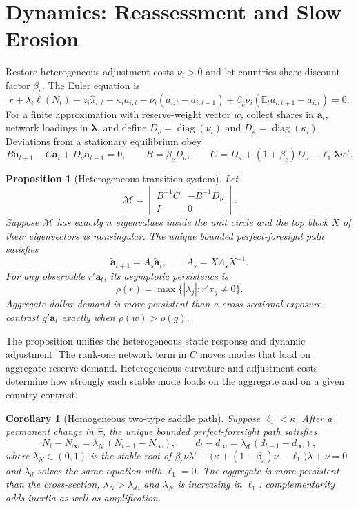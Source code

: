 \documentclass[11pt]{article}
\newtheorem{proposition}{Proposition}
\newtheorem{corollary}{Corollary}
\theoremstyle{definition}
\newcommand{\E}{\mathbb{E}}
\begin{document}
\section{Dynamics: Reassessment and Slow Erosion}\label{sec:dynamics}

Restore heterogeneous adjustment costs $\nu_i>0$ and let countries share discount factor $\beta_c$. The Euler equation is
\begin{equation}
\bar r+\lambda_i\ell(N_t)-z_i\hat\pi_{i,t}-\kappa_i a_{i,t}
-\nu_i(a_{i,t}-a_{i,t-1})
+\beta_c\nu_i(\E_ta_{i,t+1}-a_{i,t})=0.
\label{eq:euler}
\end{equation}
For a finite approximation with reserve-weight vector $w$, collect shares in $\mathbf a_t$, network loadings in $\boldsymbol\lambda$, and define $D_\nu=\operatorname{diag}(\nu_i)$ and $D_\kappa=\operatorname{diag}(\kappa_i)$. Deviations from a stationary equilibrium obey
\begin{equation}
B\widetilde{\mathbf a}_{t+1}
-C\widetilde{\mathbf a}_t
+D_\nu\widetilde{\mathbf a}_{t-1}=0,
\qquad
B=\beta_cD_\nu,
\qquad
C=D_\kappa+(1+\beta_c)D_\nu-\ell_1\boldsymbol\lambda w'.
\label{eq:heterodynamics}
\end{equation}

\begin{proposition}[Heterogeneous transition system]\label{prop:heterodynamics}
Let
\[
\mathcal M=
\begin{bmatrix}
B^{-1}C & -B^{-1}D_\nu\\
I & 0
\end{bmatrix}.
\]
Suppose $\mathcal M$ has exactly $n$ eigenvalues inside the unit circle and the top block $X$ of their eigenvectors is nonsingular. The unique bounded perfect-foresight path satisfies
\[
\widetilde{\mathbf a}_{t+1}=A_s\widetilde{\mathbf a}_t,
\qquad
A_s=X\Lambda_sX^{-1}.
\]
For any observable $r'\mathbf a_t$, its asymptotic persistence is
\[
\rho(r)=\max\{|\lambda_j|:r'x_j\neq0\}.
\]
Aggregate dollar demand is more persistent than a cross-sectional exposure contrast $g'\mathbf a_t$ exactly when $\rho(w)>\rho(g)$.
\end{proposition}

The proposition unifies the heterogeneous static response and dynamic adjustment. The rank-one network term in $C$ moves modes that load on aggregate reserve demand. Heterogeneous curvature and adjustment costs determine how strongly each stable mode loads on the aggregate and on a given country contrast.

\begin{corollary}[Homogeneous two-type saddle path]\label{prop:dynamics}
Suppose $\ell_1 < \kappa$. After a permanent change in $\hat\pi$, the unique bounded perfect-foresight path satisfies
\[
N_t - N_\infty = \lambda_N \,(N_{t-1} - N_\infty), \qquad
d_t - d_\infty = \lambda_d\,(d_{t-1} - d_\infty),
\]
where $\lambda_N \in (0,1)$ is the stable root of $\beta_c \nu \lambda^2 - \big(\kappa + (1+\beta_c)\nu - \ell_1\big)\lambda + \nu = 0$ and $\lambda_d$ solves the same equation with $\ell_1 = 0$. The aggregate is more persistent than the cross-section, $\lambda_N > \lambda_d$, and $\lambda_N$ is increasing in $\ell_1$: complementarity adds inertia as well as amplification.
\end{corollary}
\end{document}
